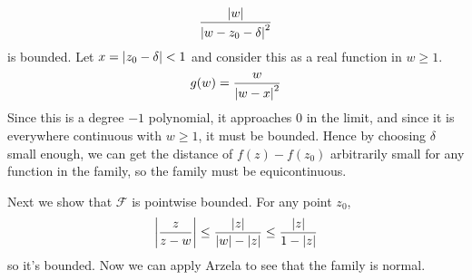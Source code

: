 \documentclass{homework}
\begin{document}
\begin{solution}
                                                                                                                                                      \[
                                                                                                                                                      \frac{\left|w\right|}{\left|w-z_0-\delta\right|^2}
                                                                                                                                                      \]
                                                                                                                                                      is bounded. Let $x= \left|z_0-\delta\right| < 1$ and consider this as a real function in $w\geq 1$.
                                                                                                                                                      \[
                                                                                                                                                      g(w) = \frac{w}{\left|w-x\right|^2}
                                                                                                                                                      \]
                                                                                                                                                      Since this is a degree $-1$ polynomial, it approaches 0 in the limit, and since it is everywhere continuous with $w\geq 1$, it must be bounded. Hence by choosing $\delta$ small enough, we can get the distance of $f(z)-f(z_0)$ arbitrarily small for any function in the family, so the family must be equicontinuous.

                                                                                                                                                      Next we show that $\mathcal{F}$ is pointwise bounded. For any point $z_0$,
                                                                                                                                                      \[
                                                                                                                                                      \left|\frac{z}{z-w}\right| \leq \frac{\left|z\right|}{\left|w\right|- \left|z\right|} \leq \frac{\left|z\right|}{1-\left|z\right|}
                                                                                                                                                      \]
                                                                                                                                                      so it's bounded. Now we can apply Arzela to see that the family is normal.
                                                                                                                                                      \end{solution}
\end{document}
